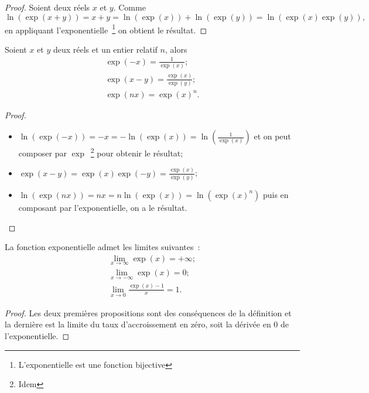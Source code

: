 \begin{proof}
  Soient deux réels $x$ et $y$. Comme
  \begin{equation}
    \ln(\exp(x+y))=x+y=\ln(\exp(x))+\ln(\exp(y))=\ln(\exp(x) \exp(y)),
  \end{equation}
  en appliquant l'exponentielle~\footnote{L'exponentielle est une fonction bijective} on obtient le résultat.
\end{proof}
%
\begin{prop}
  Soient $x$ et $y$ deux réels et un entier relatif $n$, alors
  \begin{gather}
    \exp(-x)=\frac{1}{\exp(x)}; \\
    \exp(x-y)=\frac{\exp(x)}{\exp(y)}; \\
    \exp(nx)=\exp(x)^n.
  \end{gather}
\end{prop}
\begin{proof}
  \begin{itemize}
  \item $\ln(\exp(-x))=-x=-\ln(\exp(x))=\ln \left(\frac{1}{\exp(x)}\right)$ et on peut composer par $\exp$~\footnote{Idem} pour obtenir le résultat;
  \item $\exp(x-y)=\exp(x) \exp(-y)=\frac{\exp(x)}{\exp(y)}$;
  \item $\ln(\exp(nx))=nx=n \ln(\exp(x))=\ln(\exp(x)^n)$ puis en composant par l'exponentielle, on a le résultat.
  \end{itemize}
\end{proof}
%
\begin{prop}
  La fonction exponentielle admet les limites suivantes~:
  \begin{gather}
    \lim\limits_{x \to \infty} \exp(x)=+\infty;\\
    \lim\limits_{x \to -\infty} \exp(x)=0;\\
    \lim\limits_{x \to 0} \frac{\exp(x)-1}{x}=1.
  \end{gather}
\end{prop}
\begin{proof}
  Les deux premières propositions sont des conséquences de la définition et la dernière est la limite du taux d'accroissement en zéro, soit la dérivée en 0 de l'exponentielle.
\end{proof}
%
